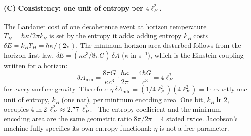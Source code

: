 \paragraph{(C) Consistency: one unit of entropy per $4\ell_P^2$.} The Landauer cost of one decoherence event at horizon temperature
$T_H=\hbar\kappa/2\pi k_B$ is set by the entropy it adds: adding entropy $k_B$ costs $\delta E=k_BT_H=\hbar\kappa/(2\pi)$. The minimum horizon area disturbed follows
from the horizon first law, $\delta E=(\kappa c^3/8\pi G)\,\delta A$ ($\kappa$ in s$^{-1}$), which is the Einstein coupling written for a horizon:
\begin{equation}\delta A_{\min}=\frac{8\pi G}{\kappa c^3}\cdot\frac{\hbar\kappa}{2\pi}=\frac{4\hbar G}{c^3}=4\ell_P^2\label{eq:th:dAmin}\end{equation}
for every surface gravity. Therefore $\eta\,\delta A_{\min}=(1/4\ell_P^2)(4\ell_P^2)=1$: exactly one unit of entropy, $k_B$ (one nat), per minimum
encoding area. One bit, $k_B\ln2$, occupies $4\ln2\,\ell_P^2\approx2.77\,\ell_P^2$. \derived\ The entropy coefficient and the minimum encoding area are
the same geometric ratio $8\pi/2\pi=4$ stated twice. Jacobson's machine fully specifies its own entropy functional: $\eta$ is not a free parameter.

